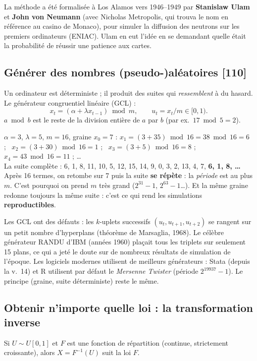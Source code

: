\documentclass[11pt,a4paper]{article}
\begin{document}
\begin{histoire}
La méthode a été formalisée à Los Alamos vers 1946--1949 par \textbf{Stanislaw Ulam} et \textbf{John von Neumann} (avec Nicholas Metropolis, qui trouva le nom en référence au casino de Monaco), pour simuler la diffusion des neutrons sur les premiers ordinateurs (ENIAC). Ulam en eut l'idée en se demandant quelle était la probabilité de réussir une patience aux cartes.
\end{histoire}

\subsection{Générer des nombres (pseudo-)aléatoires [110]}
Un ordinateur est déterministe ; il produit des suites qui \emph{ressemblent} à du hasard. Le générateur congruentiel linéaire (GCL) :
\[
x_t=(\alpha+\lambda x_{t-1})\bmod m,\qquad u_t=x_t/m\in[0,1).
\]
$a\bmod b$ est le reste de la division entière de $a$ par $b$ (par ex.\ $17\bmod 5=2$).

\begin{exemple}[title={Un GCL « jouet » calculé à la main}]
$\alpha=3$, $\lambda=5$, $m=16$, graine $x_0=7$ :
$x_1=(3+35)\bmod16=38\bmod16=6$ ; \ $x_2=(3+30)\bmod16=1$ ; \ $x_3=(3+5)\bmod16=8$ ; \ $x_4=43\bmod16=11$ ; \dots
\\ La suite complète : 6, 1, 8, 11, 10, 5, 12, 15, 14, 9, 0, 3, 2, 13, 4, 7, \textbf{6, 1, 8, \dots}
\\ Après 16 termes, on retombe sur 7 puis la suite \textbf{se répète} : la \emph{période} est au plus $m$. C'est pourquoi on prend $m$ très grand ($2^{31}-1$, $2^{63}-1$\dots). Et la même graine redonne toujours la même suite : c'est ce qui rend les simulations \textbf{reproductibles}.
\end{exemple}

\begin{attention}
Les GCL ont des défauts : les $k$-uplets successifs $(u_t,u_{t+1},u_{t+2})$ se rangent sur un petit nombre d'hyperplans (théorème de Marsaglia, 1968). Le célèbre générateur RANDU d'IBM (années 1960) plaçait tous les triplets sur seulement 15 plans, ce qui a jeté le doute sur de nombreux résultats de simulation de l'époque. Les logiciels modernes utilisent de meilleurs générateurs : Stata (depuis la v.~14) et R utilisent par défaut le \emph{Mersenne Twister} (période $2^{19937}-1$). Le principe (graine, suite déterministe) reste le même.
\end{attention}

\subsection{Obtenir n'importe quelle loi : la transformation inverse}
Si $U\sim U[0,1]$ et $F$ est une fonction de répartition (continue, strictement croissante), alors $X=F^{-1}(U)$ suit la loi $F$.
\end{document}
